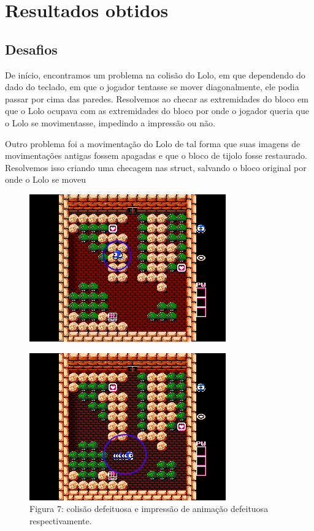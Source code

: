 \documentclass[10pt, conference, compsocconf]{IEEEtran}
\begin{document}
\section{Resultados obtidos}
\label{sec:Resultados}

\subsection{Desafios}{
\label{sec:MIPS}
De início, encontramos um problema na colisão do
Lolo, em que dependendo do dado do teclado, em que
o jogador tentasse se mover diagonalmente, ele podia
passar por cima das paredes. Resolvemos ao checar
as extremidades do bloco em que o Lolo ocupava com
as extremidades do bloco por onde o jogador queria
que o Lolo se movimentasse, impedindo a impressão
ou não.

Outro problema foi a movimentação do Lolo de tal forma que suas imagens de
movimentações antigas fossem apagadas e que o bloco de tijolo fosse restaurado.
Resolvemos isso criando uma checagem nas struct, salvando o bloco original por
onde o Lolo se moveu }

\begin{figure}[htb]
  \begin{center}
   \includegraphics[width=0.3\linewidth]{./Figures/image_9.png}
  \end{center}
  \caption{}
  \label{fig:01}
\end{figure}

\begin{figure}[htb]
  \begin{center}
   \includegraphics[width=0.3\linewidth]{./Figures/image_10.png}
  \end{center}
  \caption{Figura 7: colisão defeituosa e impressão
de animação defeituosa respectivamente.}
  \label{fig:01}
\end{figure}
\end{document}
